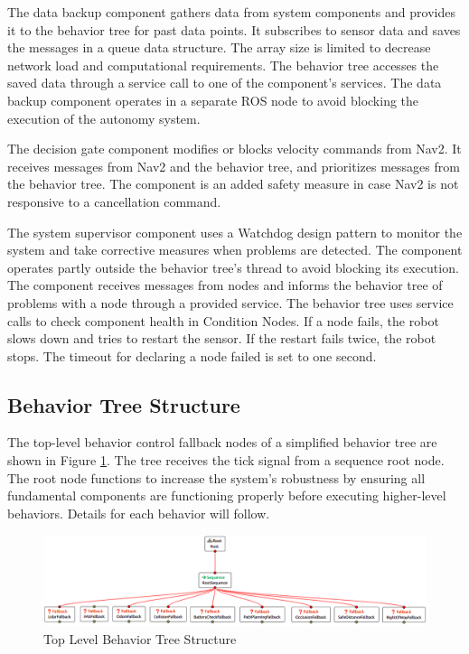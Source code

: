 \documentclass[letterpaper, 10pt, conference]{ieeeconf}
\begin{document}
The data backup component gathers data from system components and provides it to the behavior tree for past data points. It subscribes to sensor data and saves the messages in a queue data structure. The array size is limited to decrease network load and computational requirements. The behavior tree accesses the saved data through a service call to one of the component's services. The data backup component operates in a separate ROS node to avoid blocking the execution of the autonomy system.

The decision gate component modifies or blocks velocity commands from Nav2. It receives messages from Nav2 and the behavior tree, and prioritizes messages from the behavior tree. The component is an added safety measure in case Nav2 is not responsive to a cancellation command.

The system supervisor component uses a Watchdog design pattern to monitor the system and take corrective measures when problems are detected. The component operates partly outside the behavior tree's thread to avoid blocking its execution. The component receives messages from nodes and informs the behavior tree of problems with a node through a provided service. The behavior tree uses service calls to check component health in Condition Nodes. If a node fails, the robot slows down and tries to restart the sensor. If the restart fails twice, the robot stops. The timeout for declaring a node failed is set to one second.

\subsection{Behavior Tree Structure}

The top-level behavior control fallback nodes of a simplified behavior tree are shown in Figure \ref{fig:top_level_bt}. The tree receives the tick signal from a sequence root node. The root node functions to increase the system's robustness by ensuring all fundamental components are functioning properly before executing higher-level behaviors. Details for each behavior will follow.

\begin{figure}[ht]
	\centering
	\includegraphics[width=0.9\linewidth]{Figures/simplified_bt_inverted.png}
	\caption{Top Level Behavior Tree Structure}
	\label{fig:top_level_bt}
\end{figure}
\end{document}
